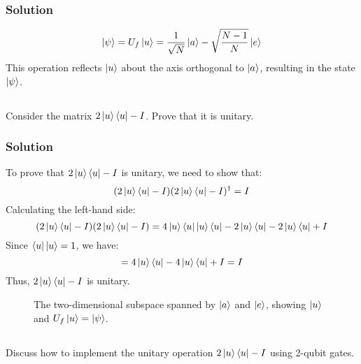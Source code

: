 \documentclass[12pt]{article} %
\begin{document}
\subsubsection*{Solution}
\[\ket{\psi} = U_f \ket{u} = \frac{1}{\sqrt{N}} \ket{a} - \sqrt{\frac{N-1}{N}} \ket{e}\]
This operation reflects \(\ket{u}\) about the axis orthogonal to \(\ket{a}\), resulting in the state \(\ket{\psi}\).

\subsection{}
Consider the matrix \(2 \ket{u}\bra{u} - I\). Prove that it is unitary.
\subsubsection*{Solution}
To prove that \(2 \ket{u}\bra{u} - I\) is unitary, we need to show that:
\[(2 \ket{u}\bra{u} - I)(2 \ket{u}\bra{u} - I)^\dagger = I\]
Calculating the left-hand side:
\[(2 \ket{u}\bra{u} - I)(2 \ket{u}\bra{u} - I) = 4 \ket{u}\bra{u}\ket{u}\bra{u} - 2 \ket{u}\bra{u} - 2 \ket{u}\bra{u} + I\]
Since \(\bra{u}\ket{u} = 1\), we have:
\[= 4 \ket{u}\bra{u} - 4 \ket{u}\bra{u} + I = I\]
Thus, \(2 \ket{u}\bra{u} - I\) is unitary.
\begin{figure}[h]
    \centering
    \caption{The two-dimensional subspace spanned by $\ket{a}$ and $\ket{e}$, showing $\ket{u}$ and $U_f\ket{u} = \ket{\psi}$.}
    \label{fig:subspace}
\end{figure}

\subsection{}
Discuss how to implement the unitary operation \(2\ket{u}\bra{u} - I\) using 2-qubit gates.
\end{document}
